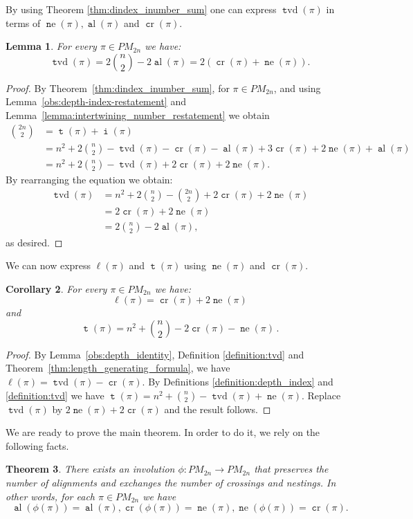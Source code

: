 \documentclass[11pt]{amsart}
\numberwithin{figure}{section}
\DeclareMathOperator{\inumber}{\mathtt i}
\DeclareMathOperator{\dindex}{\mathtt t}
\DeclareMathOperator{\cro}{\mathtt cr}
\DeclareMathOperator{\nst}{\mathtt ne}
\DeclareMathOperator{\al}{\mathtt al}
\DeclareMathOperator{\tvd}{\mathtt tvd}
\theoremstyle{plain}
\newtheorem{theorem}{Theorem}[section]
\newtheorem{lemma}[theorem]{Lemma}
\newtheorem{corollary}[theorem]{Corollary}
\theoremstyle{definition}
\begin{document}
By using Theorem \ref{thm:dindex_inumber_sum} one can express $\tvd(\pi)$ in terms of $\nst(\pi), \al(\pi)$ and $\cro(\pi)$.

\begin{lemma}
	For every $\pi\in PM_{2n}$ we have:
	$$\tvd(\pi) = 2\binom{n}{2} - 2\al(\pi) = 2(\cro(\pi) + \nst(\pi)).$$
\end{lemma}

\begin{proof}
	By Theorem~\ref{thm:dindex_inumber_sum}, for $\pi\in PM_{2n}$,
	and using Lemma~\ref{obs:depth-index-restatement} and Lemma~\ref{lemma:intertwining_number_restatement} we obtain
	\begin{align*}
		\binom{2n}{2} 
		&= \dindex(\pi)+\inumber(\pi) \\
		&= n^2 + 2\binom{n}{2} -\tvd(\pi) - \cro(\pi) - \al(\pi) + 3\cro(\pi) + 2\nst(\pi) + \al(\pi) \\
		&= n^2 + 2\binom{n}{2} - \tvd(\pi) + 2\cro(\pi) + 2\nst(\pi).
	\end{align*}
	By rearranging the equation we obtain:
	\begin{align*}
	    \tvd(\pi) 
	    &= n^2 + 2\binom{n}{2 }- \binom{2n}{2} + 2\cro(\pi) + 2\nst(\pi) \\
	    &= 2\cro(\pi) + 2\nst(\pi) \\
	    &= 2\binom{n}{2} - 2\al(\pi),
	\end{align*}
	as desired.
\end{proof}

We can now express $\ell(\pi)$ and $\dindex(\pi)$ using $\nst(\pi)$ and $\cro(\pi)$.
\begin{corollary}\label{cor:statistic_formulas}
For every $\pi\in PM_{2n}$ we have:
$$\ell(\pi)=\cro(\pi)+2\nst(\pi)$$
and 
$$\dindex(\pi)=n^2 + \binom{n}{2}-2\cro(\pi)-\nst(\pi)\,.$$
\end{corollary} 
\begin{proof} By Lemma~\ref{obs:depth_identity}, Definition \ref{definition:tvd} and Theorem~\ref{thm:length_generating_formula}, we have $\ell(\pi) = \tvd(\pi)-\cro(\pi)$. By Definitions \ref{definition:depth_index} and  \ref{definition:tvd} we have $\dindex(\pi)=n^2 + \binom{n}{2} - \tvd(\pi) + \nst(\pi)$.
Replace $\tvd(\pi)$ by $2\nst(\pi)+2\cro(\pi)$ and the result follows.
\end{proof}

We are ready to prove the main theorem.
In order to do it, we rely on the following facts.
\begin{theorem}\cite[Theorem~1.2]{CrossingNestingDistribution}\label{thm:involution_existence}
There exists an involution $\phi:PM_{2n}\to PM_{2n}$ that preserves the number of alignments and exchanges the number of crossings and nestings. In other words, for each $\pi\in PM_{2n}$ we have 
$$\al(\phi(\pi)) = \al(\pi), \cro(\phi(\pi)) = \nst(\pi), \nst(\phi(\pi)) = \cro(\pi).$$
\end{theorem}
\end{document}

